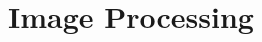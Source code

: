 \documentclass[final]{beamer}\usepackage[]{graphicx}\usepackage[]{color}
\begin{document}
\begin{frame}[fragile]
\begin{multicols}{2}
\begin{minipage}{\linewidth}
\begin{multicols}{2}


\vfill
\columnbreak





\end{multicols}
\end{minipage}

\section{Image Processing} 


\end{multicols}
\end{frame}
\end{document}
